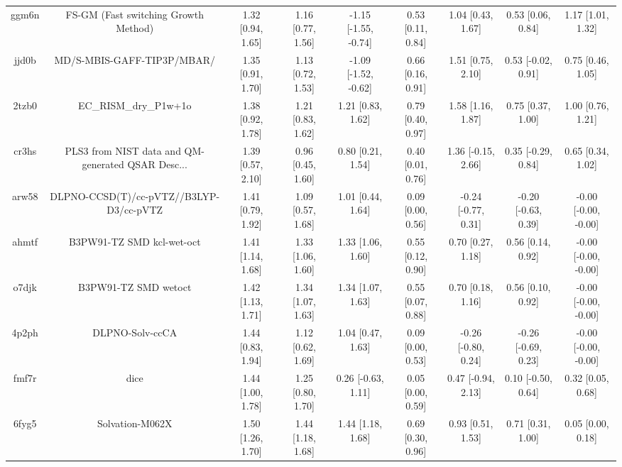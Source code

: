 \documentclass{article}
\begin{document}
\begin{center}
\begin{longtable}{|ccccccccc|}
 ggm6n &               FS-GM (Fast switching Growth Method) &  1.32 [0.94, 1.65] &  1.16 [0.77, 1.56] &  -1.15 [-1.55, -0.74] &  0.53 [0.11, 0.84] &    1.04 [0.43, 1.67] &    0.53 [0.06, 0.84] &     1.17 [1.01, 1.32] \\
 jjd0b &                         MD/S-MBIS-GAFF-TIP3P/MBAR/ &  1.35 [0.91, 1.70] &  1.13 [0.72, 1.53] &  -1.09 [-1.52, -0.62] &  0.66 [0.16, 0.91] &    1.51 [0.75, 2.10] &   0.53 [-0.02, 0.91] &     0.75 [0.46, 1.05] \\
 2tzb0 &                              EC\_RISM\_dry\_P1w+1o &  1.38 [0.92, 1.78] &  1.21 [0.83, 1.62] &     1.21 [0.83, 1.62] &  0.79 [0.40, 0.97] &    1.58 [1.16, 1.87] &    0.75 [0.37, 1.00] &     1.00 [0.76, 1.21] \\
 cr3hs &  PLS3 from NIST data and QM-generated QSAR Desc... &  1.39 [0.57, 2.10] &  0.96 [0.45, 1.60] &     0.80 [0.21, 1.54] &  0.40 [0.01, 0.76] &   1.36 [-0.15, 2.66] &   0.35 [-0.29, 0.84] &     0.65 [0.34, 1.02] \\
 arw58 &            DLPNO-CCSD(T)/cc-pVTZ//B3LYP-D3/cc-pVTZ &  1.41 [0.79, 1.92] &  1.09 [0.57, 1.68] &     1.01 [0.44, 1.64] &  0.09 [0.00, 0.56] &  -0.24 [-0.77, 0.31] &  -0.20 [-0.63, 0.39] &  -0.00 [-0.00, -0.00] \\
 ahmtf &                          B3PW91-TZ SMD kcl-wet-oct &  1.41 [1.14, 1.68] &  1.33 [1.06, 1.60] &     1.33 [1.06, 1.60] &  0.55 [0.12, 0.90] &    0.70 [0.27, 1.18] &    0.56 [0.14, 0.92] &  -0.00 [-0.00, -0.00] \\
 o7djk &                               B3PW91-TZ SMD wetoct &  1.42 [1.13, 1.71] &  1.34 [1.07, 1.63] &     1.34 [1.07, 1.63] &  0.55 [0.07, 0.88] &    0.70 [0.18, 1.16] &    0.56 [0.10, 0.92] &  -0.00 [-0.00, -0.00] \\
 4p2ph &                                    DLPNO-Solv-ccCA &  1.44 [0.83, 1.94] &  1.12 [0.62, 1.69] &     1.04 [0.47, 1.63] &  0.09 [0.00, 0.53] &  -0.26 [-0.80, 0.24] &  -0.26 [-0.69, 0.23] &  -0.00 [-0.00, -0.00] \\
 fmf7r &                                               dice &  1.44 [1.00, 1.78] &  1.25 [0.80, 1.70] &    0.26 [-0.63, 1.11] &  0.05 [0.00, 0.59] &   0.47 [-0.94, 2.13] &   0.10 [-0.50, 0.64] &     0.32 [0.05, 0.68] \\
 6fyg5 &                                    Solvation-M062X &  1.50 [1.26, 1.70] &  1.44 [1.18, 1.68] &     1.44 [1.18, 1.68] &  0.69 [0.30, 0.96] &    0.93 [0.51, 1.53] &    0.71 [0.31, 1.00] &     0.05 [0.00, 0.18] \\

\end{longtable}
\end{center}
\end{document}
